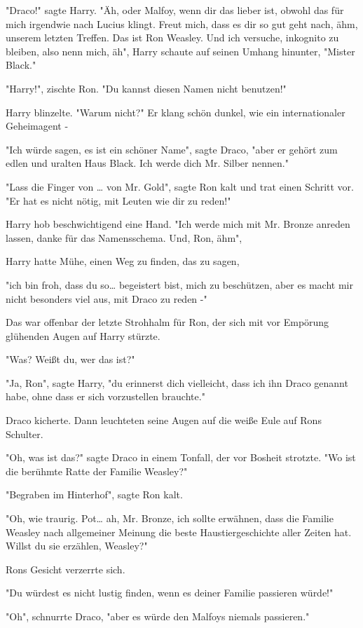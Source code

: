 {"Draco!" sagte Harry. "Äh, oder Malfoy, wenn dir das lieber ist, obwohl das für mich irgendwie nach Lucius klingt. Freut mich, dass es dir so gut geht nach, ähm, unserem letzten Treffen. Das ist Ron Weasley. Und ich versuche, inkognito zu bleiben, also nenn mich, äh", Harry schaute auf seinen Umhang hinunter, "Mister Black."

"Harry!", zischte Ron. "Du kannst diesen Namen nicht benutzen!"

Harry blinzelte. "Warum nicht?" Er klang schön dunkel, wie ein internationaler Geheimagent -

"Ich würde sagen, es ist ein schöner Name", sagte Draco, "aber er gehört zum edlen und uralten Haus Black. Ich werde dich Mr. Silber nennen."

"Lass die Finger von … von Mr. Gold", sagte Ron kalt und trat einen Schritt vor. "Er hat es nicht nötig, mit Leuten wie dir zu reden!"

Harry hob beschwichtigend eine Hand. "Ich werde mich mit Mr. Bronze anreden lassen, danke für das Namensschema. Und, Ron, ähm",

Harry hatte Mühe, einen Weg zu finden, das zu sagen,

"ich bin froh, dass du so… begeistert bist, mich zu beschützen, aber es macht mir nicht besonders viel aus, mit Draco zu reden -"

Das war offenbar der letzte Strohhalm für Ron, der sich mit vor Empörung glühenden Augen auf Harry stürzte.

"Was? Weißt du, wer das ist?"

"Ja, Ron", sagte Harry, "du erinnerst dich vielleicht, dass ich ihn Draco genannt habe, ohne dass er sich vorzustellen brauchte."

Draco kicherte. Dann leuchteten seine Augen auf die weiße Eule auf Rons Schulter.

"Oh, was ist das?" sagte Draco in einem Tonfall, der vor Bosheit strotzte. "Wo ist die berühmte Ratte der Familie Weasley?"

"Begraben im Hinterhof", sagte Ron kalt.

"Oh, wie traurig. Pot… ah, Mr. Bronze, ich sollte erwähnen, dass die Familie Weasley nach allgemeiner Meinung die beste Haustiergeschichte aller Zeiten hat. Willst du sie erzählen, Weasley?"

Rons Gesicht verzerrte sich.

"Du würdest es nicht lustig finden, wenn es deiner Familie passieren würde!"

"Oh", schnurrte Draco, "aber es würde den Malfoys niemals passieren."

}
